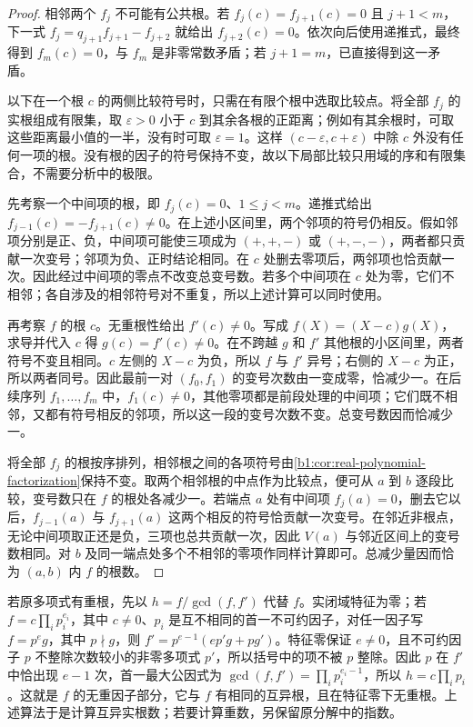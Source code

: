 \begin{proof}
	相邻两个 \(f_j\) 不可能有公共根。若 \(f_j(c)=f_{j+1}(c)=0\) 且 \(j+1<m\)，下一式 \(f_j=q_{j+1}f_{j+1}-f_{j+2}\) 就给出 \(f_{j+2}(c)=0\)。依次向后使用递推式，最终得到 \(f_m(c)=0\)，与 \(f_m\) 是非零常数矛盾；若 \(j+1=m\)，已直接得到这一矛盾。

	以下在一个根 \(c\) 的两侧比较符号时，只需在有限个根中选取比较点。将全部 \(f_j\) 的实根组成有限集，取 \(\varepsilon>0\) 小于 \(c\) 到其余各根的正距离；例如有其余根时，可取这些距离最小值的一半，没有时可取 \(\varepsilon=1\)。这样 \((c-\varepsilon,c+\varepsilon)\) 中除 \(c\) 外没有任何一项的根。没有根的因子的符号保持不变，故以下局部比较只用域的序和有限集合，不需要分析中的极限。

	先考察一个中间项的根，即 \(f_j(c)=0\)、\(1\leq j<m\)。递推式给出 \(f_{j-1}(c)=-f_{j+1}(c)\neq0\)。在上述小区间里，两个邻项的符号仍相反。假如邻项分别是正、负，中间项可能使三项成为 \((+,+,-)\) 或 \((+,-,-)\)，两者都只贡献一次变号；邻项为负、正时结论相同。在 \(c\) 处删去零项后，两邻项也恰贡献一次。因此经过中间项的零点不改变总变号数。若多个中间项在 \(c\) 处为零，它们不相邻；各自涉及的相邻符号对不重复，所以上述计算可以同时使用。

	再考察 \(f\) 的根 \(c\)。无重根性给出 \(f'(c)\neq0\)。写成 \(f(X)=(X-c)g(X)\)，求导并代入 \(c\) 得 \(g(c)=f'(c)\neq0\)。在不跨越 \(g\) 和 \(f'\) 其他根的小区间里，两者符号不变且相同。\(c\) 左侧的 \(X-c\) 为负，所以 \(f\) 与 \(f'\) 异号；右侧的 \(X-c\) 为正，所以两者同号。因此最前一对 \((f_0,f_1)\) 的变号次数由一变成零，恰减少一。在后续序列 \(f_1,\ldots,f_m\) 中，\(f_1(c)\neq0\)，其他零项都是前段处理的中间项；它们既不相邻，又都有符号相反的邻项，所以这一段的变号次数不变。总变号数因而恰减少一。

	将全部 \(f_j\) 的根按序排列，相邻根之间的各项符号由\cref{b1:cor:real-polynomial-factorization}保持不变。取两个相邻根的中点作为比较点，便可从 \(a\) 到 \(b\) 逐段比较，变号数只在 \(f\) 的根处各减少一。若端点 \(a\) 处有中间项 \(f_j(a)=0\)，删去它以后，\(f_{j-1}(a)\) 与 \(f_{j+1}(a)\) 这两个相反的符号恰贡献一次变号。在邻近非根点，无论中间项取正还是负，三项也总共贡献一次，因此 \(V(a)\) 与邻近区间上的变号数相同。对 \(b\) 及同一端点处多个不相邻的零项作同样计算即可。总减少量因而恰为 \((a,b)\) 内 \(f\) 的根数。
\end{proof}

若原多项式有重根，先以 \(h=f/\gcd(f,f')\) 代替 \(f\)。实闭域特征为零；若 \(f=c\prod_i p_i^{e_i}\)，其中 \(c\neq0\)、\(p_i\) 是互不相同的首一不可约因子，对任一因子写 \(f=p^e g\)，其中 \(p\nmid g\)，则 \(f'=p^{e-1}(ep'g+pg')\)。特征零保证 \(e\neq0\)，且不可约因子 \(p\) 不整除次数较小的非零多项式 \(p'\)，所以括号中的项不被 \(p\) 整除。因此 \(p\) 在 \(f'\) 中恰出现 \(e-1\) 次，首一最大公因式为 \(\gcd(f,f')=\prod_i p_i^{e_i-1}\)，所以 \(h=c\prod_i p_i\)。这就是 \(f\) 的无重因子部分，它与 \(f\) 有相同的互异根，且在特征零下无重根。上述算法于是计算互异实根数；若要计算重数，另保留原分解中的指数。


